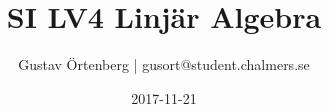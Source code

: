 \documentclass{article}
\title{SI LV4 Linjär Algebra}
\author{Gustav Örtenberg | \small{gusort@student.chalmers.se}}
\date{2017-11-21}
\begin{document}
\maketitle
\section{}


\section{}


\section{}


\section{}


\section{}


\section{}

\end{document}
